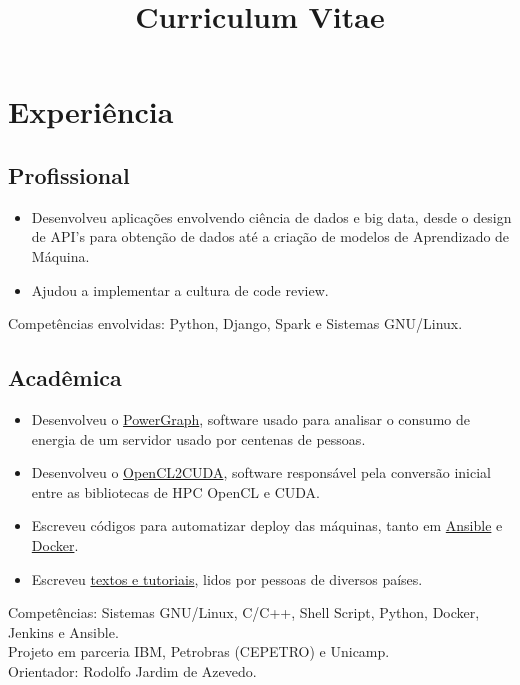 \documentclass[10pt, a4paper, roman]{moderncv} %
\title{Curriculum Vitae}
\begin{document}
\makecvtitle %

\section{Experiência}

\subsection{Profissional}

{
    \begin{itemize}
        \item Desenvolveu aplicações envolvendo ciência de dados e big data, desde o design de API's para obtenção de dados até a criação de modelos de Aprendizado de Máquina.
        \item Ajudou a implementar a cultura de code review.
    \end{itemize}
    Competências envolvidas: Python, Django, Spark e Sistemas GNU/Linux.
}

\subsection{Acadêmica}
{
    \begin{itemize}
        \item Desenvolveu o \href{https://github.com/Guilhermeslucas/powergraph}{PowerGraph}, software usado para analisar o consumo de energia de um servidor usado por centenas de pessoas.
        \item Desenvolveu o \href{https://github.com/Guilhermeslucas/OpenCL2CUDA}{OpenCL2CUDA}, software responsável pela conversão inicial entre as bibliotecas de HPC OpenCL e CUDA.
        \item Escreveu códigos para automatizar deploy das máquinas, tanto em \href{https://github.com/Guilhermeslucas/Ansible-Code}{Ansible} e 
            \href{https://github.com/Guilhermeslucas/Dockerfiles}{Docker}.
        \item Escreveu \href{http://openpower.ic.unicamp.br/blog/}{textos e tutoriais}, lidos por pessoas de diversos países. 
    \end{itemize}
    Competências: Sistemas GNU/Linux, C/C++, Shell Script, Python, Docker, Jenkins e Ansible.\\ 
    Projeto em parceria IBM, Petrobras (CEPETRO) e Unicamp.\\
    Orientador: Rodolfo Jardim de Azevedo.
}
\end{document}
